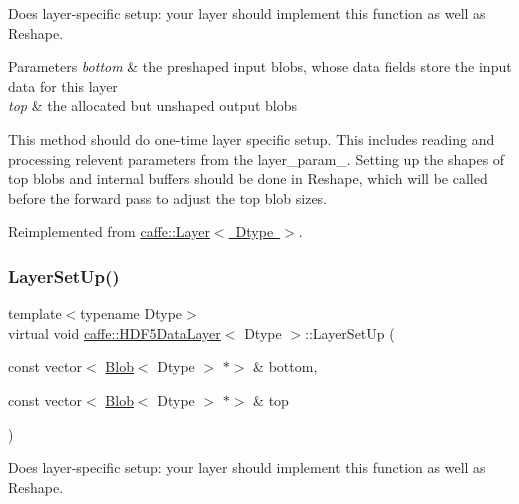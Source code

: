 Does layer-\/specific setup\+: your layer should implement this function as well as Reshape. 


\begin{DoxyParams}{Parameters}
{\em bottom} & the preshaped input blobs, whose data fields store the input data for this layer \\
\hline
{\em top} & the allocated but unshaped output blobs\\
\hline
\end{DoxyParams}
This method should do one-\/time layer specific setup. This includes reading and processing relevent parameters from the {\ttfamily layer\+\_\+param\+\_\+}. Setting up the shapes of top blobs and internal buffers should be done in {\ttfamily Reshape}, which will be called before the forward pass to adjust the top blob sizes. 

Reimplemented from \mbox{\hyperlink{classcaffe_1_1_layer_a481323a3e0972c682787f2137468c29f}{caffe\+::\+Layer$<$ Dtype $>$}}.

\mbox{\label{classcaffe_1_1_h_d_f5_data_layer_a7e7281a510b9d6713c3c79c6e50a199b}} 
\subsubsection{\texorpdfstring{Layer\+Set\+Up()}{LayerSetUp()}\hspace{0.1cm}{\footnotesize\ttfamily [2/2]}}
{\footnotesize\ttfamily template$<$typename Dtype$>$ \\
virtual void \mbox{\hyperlink{classcaffe_1_1_h_d_f5_data_layer}{caffe\+::\+H\+D\+F5\+Data\+Layer}}$<$ Dtype $>$\+::Layer\+Set\+Up (\begin{DoxyParamCaption}\item[{const vector$<$ \mbox{\hyperlink{classcaffe_1_1_blob}{Blob}}$<$ Dtype $>$ $\ast$$>$ \&}]{bottom,  }\item[{const vector$<$ \mbox{\hyperlink{classcaffe_1_1_blob}{Blob}}$<$ Dtype $>$ $\ast$$>$ \&}]{top }\end{DoxyParamCaption})\hspace{0.3cm}{\ttfamily [virtual]}}



Does layer-\/specific setup\+: your layer should implement this function as well as Reshape. 


